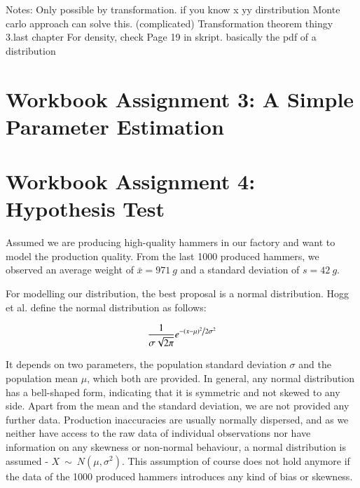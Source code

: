 Notes:
Only possible by transformation. if you know x yy dirstribution 
Monte carlo approach can solve this. (complicated)
Transformation theorem thingy 3.last chapter
For density, check Page 19 in skript. basically the pdf of a distribution




\chapter{Workbook Assignment 3: A Simple Parameter Estimation}	
\chapter{Workbook Assignment 4: Hypothesis Test}	

Assumed we are producing high-quality hammers in our factory and want to model the production quality. From the last 1000 produced hammers, we observed an average weight of $\bar{x}=971~g$ and a standard deviation of $s=42~g$.

For modelling our distribution, the best proposal is a normal distribution. Hogg et al. \cite[Definition~3.4.1]{hogg} define the normal distribution as follows: 

\begin{equation} \frac{1}{{\sigma \sqrt {2\pi } }}e^{{{ - \left( {x - \mu } \right)^2 } \mathord{\left/ {\vphantom {{ - \left( {x - \mu } \right)^2 } {2\sigma ^2 }}} \right. \kern-\nulldelimiterspace}{2\sigma ^2 }}}
\label{eq:normaldist}
\end{equation}


It depends on two parameters, the population standard deviation $\sigma$ and the population mean $\mu$, which both are provided. In general, any normal distribution has a bell-shaped form, indicating that it is symmetric and not skewed to any side. Apart from the mean and the standard deviation, we are not provided any further data. Production inaccuracies are usually normally dispersed, and as we neither have access to the raw data of individual observations nor have information on any skewness or non-normal behaviour, a normal distribution is assumed - $ X~\sim~N(\mu, \sigma^2)$. This assumption of course does not hold anymore if the data of the 1000 produced hammers introduces any kind of bias or skewness. 


